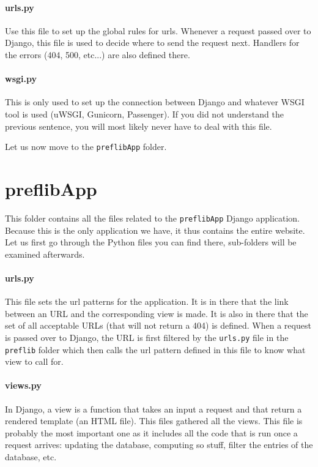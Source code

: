 \documentclass{report}
\begin{document}
	\paragraph*{\faFileO{} urls.py} Use this file to set up the global rules for urls. Whenever a request passed over to Django, this file is used to decide where to send the request next. Handlers for the errors (404, 500, etc...) are also defined there.
	
	\paragraph*{\faFileO{} wsgi.py} This is only used to set up the connection between Django and whatever WSGI tool is used (uWSGI, Gunicorn, Passenger). If you did not understand the previous sentence, you will most likely never have to deal with this file.
	
	\medskip 
	
	Let us now move to the \texttt{preflibApp} folder.
	
	\section*{\faFolderO{} preflibApp}
	
	This folder contains all the files related to the \texttt{preflibApp} Django application. Because this is the only application we have, it thus contains the entire website. Let us first go through the Python files you can find there, sub-folders will be examined afterwards.
	
	\paragraph{\faFileO{} urls.py} This file sets the url patterns for the application. It is in there that the link between an URL and the corresponding view is made. It is also in there that the set of all acceptable URLs (that will not return a 404) is defined. When a request is passed over to Django, the URL is first filtered by the \texttt{urls.py} file in the \texttt{preflib} folder which then calls the url pattern defined in this file to know what view to call for.
	
	\paragraph{\faFileO{} views.py} In Django, a view is a function that takes an input a request and that return a rendered template (an HTML file). This files gathered all the views. This file is probably the most important one as it includes all the code that is run once a request arrives: updating the database, computing so stuff, filter the entries of the database, etc.
	
\end{document}
